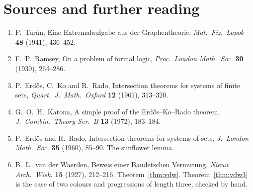 \section*{Sources and further reading}

\begin{enumerate}
\item P.~Tur\'an, Eine Extremalaufgabe aus der Graphentheorie, \emph{Mat.\ Fiz.\ Lapok} \textbf{48} (1941), 436--452.
\item F.~P.~Ramsey, On a problem of formal logic, \emph{Proc.\ London Math.\ Soc.} \textbf{30} (1930), 264--286.
\item P.~Erd\H os, C.~Ko and R.~Rado, Intersection theorems for systems of finite sets, \emph{Quart.\ J.\ Math.\ Oxford} \textbf{12} (1961), 313--320.
\item G.~O.~H.~Katona, A simple proof of the Erd\H os--Ko--Rado theorem, \emph{J.\ Combin.\ Theory Ser.\ B} \textbf{13} (1972), 183--184.
\item P.~Erd\H os and R.~Rado, Intersection theorems for systems of sets, \emph{J.\ London Math.\ Soc.} \textbf{35} (1960), 85--90. The sunflower lemma.
\item B.~L.~van der Waerden, Beweis einer Baudetschen Vermutung, \emph{Nieuw Arch.\ Wisk.} \textbf{15} (1927), 212--216. Theorem~\ref{thm:vdw}. Theorem~\ref{thm:vdw3} is the case of two colours and progressions of length three, checked by hand.
\end{enumerate}
